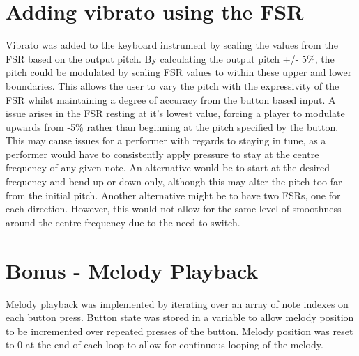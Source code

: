 \documentclass[titlepage]{scrartcl}
\begin{document}
    \section{Adding vibrato using the FSR}
    Vibrato was added to the keyboard instrument by scaling the values from the
    FSR based on the output pitch. By calculating the output pitch +/- 5\%, the
    pitch could be modulated by scaling FSR values to within these upper and
    lower boundaries. This allows the user to vary the pitch with the
    expressivity of the FSR whilst maintaining a degree of accuracy from the
    button based input. A issue arises in the FSR resting at it's lowest value,
    forcing a player to modulate upwards from -5\% rather than beginning at the
    pitch specified by the button. This may cause issues for a performer with
    regards to staying in tune, as a performer would have to consistently apply
    pressure to stay at the centre frequency of any given note. An
    alternative would be to start at the desired frequency and bend up or down
    only, although this may alter the pitch too far from the initial pitch.
    Another alternative might be to have two FSRs, one for each direction.
    However, this would not allow for the same level of smoothness around the
    centre frequency due to the need to switch.

    \section{Bonus - Melody Playback}
    Melody playback was implemented by iterating over an array of note indexes
    on each button press. Button state was stored in a variable to allow melody
    position to be incremented over repeated presses of the button. Melody
    position was reset to 0 at the end of each loop to allow for continuous
    looping of the melody.

    \printbibliography
\end{document}
